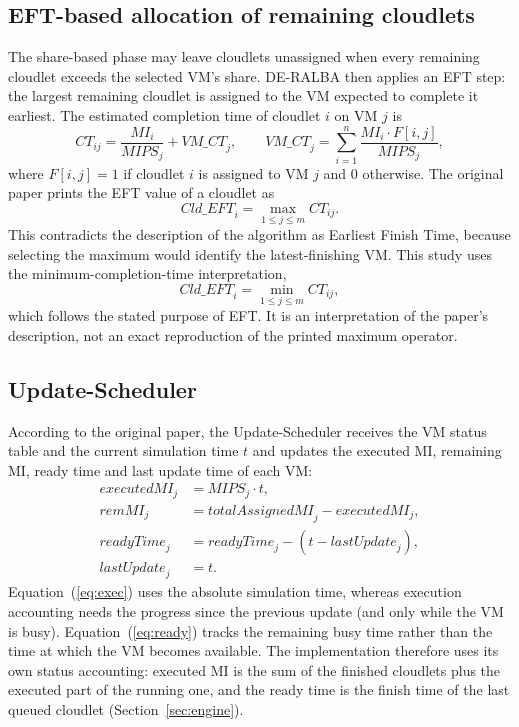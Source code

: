 \documentclass[default,sn-mathphys,Numbered]{sn-jnl}
\begin{document}
\subsection{EFT-based allocation of remaining cloudlets}
The share-based phase may leave cloudlets unassigned when every remaining cloudlet exceeds the selected VM's share. DE-RALBA then applies an EFT step: the largest remaining cloudlet is assigned to the VM expected to complete it earliest. The estimated completion time of cloudlet $i$ on VM $j$ is
\begin{equation}\label{eq:ct}
\mathit{CT}_{ij} = \frac{\mathit{MI}_i}{\mathit{MIPS}_j} + \mathit{VM\_CT}_j, \qquad
\mathit{VM\_CT}_j = \sum_{i=1}^{n} \frac{\mathit{MI}_i \cdot F[i,j]}{\mathit{MIPS}_j},
\end{equation}
where $F[i,j] = 1$ if cloudlet $i$ is assigned to VM $j$ and $0$ otherwise. The original paper prints the EFT value of a cloudlet as
\begin{equation}\label{eq:eftmax}
\mathit{Cld\_EFT}_i = \max_{1 \le j \le m} \mathit{CT}_{ij}.
\end{equation}
This contradicts the description of the algorithm as Earliest Finish Time, because selecting the maximum would identify the latest-finishing VM. This study uses the minimum-completion-time interpretation,
\begin{equation}\label{eq:eftmin}
\mathit{Cld\_EFT}_i = \min_{1 \le j \le m} \mathit{CT}_{ij},
\end{equation}
which follows the stated purpose of EFT. It is an interpretation of the paper's description, not an exact reproduction of the printed maximum operator.

\subsection{Update-Scheduler}
According to the original paper, the Update-Scheduler receives the VM status table and the current simulation time $t$ and updates the executed MI, remaining MI, ready time and last update time of each VM:
\begin{align}
\mathit{executedMI}_j &= \mathit{MIPS}_j \cdot t, \label{eq:exec}\\
\mathit{remMI}_j &= \mathit{totalAssignedMI}_j - \mathit{executedMI}_j, \label{eq:rem}\\
\mathit{readyTime}_j &= \mathit{readyTime}_j - (t - \mathit{lastUpdate}_j), \label{eq:ready}\\
\mathit{lastUpdate}_j &= t. \label{eq:last}
\end{align}
Equation~(\ref{eq:exec}) uses the absolute simulation time, whereas execution accounting needs the progress since the previous update (and only while the VM is busy). Equation~(\ref{eq:ready}) tracks the remaining busy time rather than the time at which the VM becomes available. The implementation therefore uses its own status accounting: executed MI is the sum of the finished cloudlets plus the executed part of the running one, and the ready time is the finish time of the last queued cloudlet (Section~\ref{sec:engine}).
\end{document}
